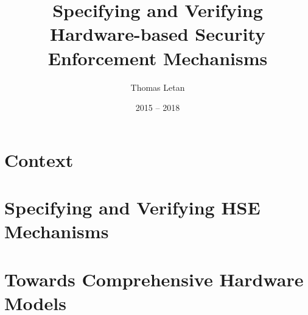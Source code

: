 \documentclass[oneside,a4paper]{memoir}
\title{Specifying and Verifying Hardware-based Security Enforcement Mechanisms}
\author{Thomas Letan}
\date{2015 -- 2018}
\theoremstyle{break}
\begin{document}
  \frontmatter

  \maketitle

  \cleardoublepage

  \begin{abstract}
    
  \end{abstract}

  \cleardoublepage

  \tableofcontents

  \cleardoublepage

  \listoffigures
  \listoftables
  

  \mainmatter

  

  \part{Context}
  \label{part:context}
  
  

  \part{Specifying and Verifying HSE Mechanisms}
  \label{part:speccert}
  
  

  \part{Towards Comprehensive Hardware Models}
  \label{part:freespec}
  

  

  \appendix

  
  

  \printacronyms[include-classes={abbrev},heading={chapter},name=Acronyms]
  \printindex
  
  
\end{document}
